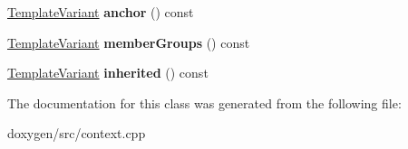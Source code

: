 \begin{DoxyCompactItemize}
\mbox{\hyperlink{class_template_variant}{Template\+Variant}} {\bfseries anchor} () const
\item 
\mbox{\label{class_member_list_info_context_1_1_private_af95a7a7c3f9bead2ec20fc64801502d9}} 
\mbox{\hyperlink{class_template_variant}{Template\+Variant}} {\bfseries member\+Groups} () const
\item 
\mbox{\label{class_member_list_info_context_1_1_private_a4a469d579894dc86930623fe73395ae2}} 
\mbox{\hyperlink{class_template_variant}{Template\+Variant}} {\bfseries inherited} () const
\end{DoxyCompactItemize}


The documentation for this class was generated from the following file\+:\begin{DoxyCompactItemize}
\item 
doxygen/src/context.\+cpp\end{DoxyCompactItemize}
